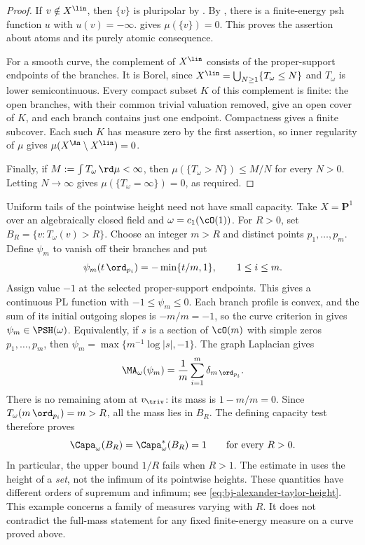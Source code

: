 \begin{proof}
If $v\notin X^{\lin}$, then $\{v\}$ is pluripolar by
.  By \cite[Corollary~7.48]{BJ22}, there
is a finite-energy psh function $u$ with $u(v)=-\infty$.
 gives $\mu(\{v\})=0$.
This proves the assertion about atoms and its purely atomic consequence.

For a smooth curve, the complement of $X^{\lin}$ consists of the
proper-support endpoints of the branches.
It is Borel, since
$X^{\lin}=\bigcup_{N\geq1}\{T_\omega\leq N\}$ and $T_\omega$ is lower
semicontinuous.  Every compact subset $K$ of this complement is finite:
the open branches, with their common trivial valuation removed, give
an open cover of $K$, and each branch contains just one endpoint.
Compactness gives a finite subcover.  Each such $K$ has measure zero by
the first assertion, so inner regularity of $\mu$ gives
$\mu(X^{\An}\setminus X^{\lin})=0$.

Finally, if $M:=\int T_\omega\,\rd\mu<\infty$, then
$\mu(\{T_\omega>N\})\leq M/N$ for every $N>0$.
Letting $N\to\infty$ gives $\mu(\{T_\omega=\infty\})=0$, as required.
\end{proof}

\begin{example}
\label{ex:ch49-uniform-tail-capacity}
Uniform tails of the pointwise height need not have small capacity.
Take $X=\mathbf P^1$ over an algebraically closed field and
$\omega=c_1(\cO(1))$.  For $R>0$, set
$B_R=\{v:T_\omega(v)>R\}$.
Choose an integer $m>R$ and distinct points $p_1,\dots,p_m$.
Define $\psi_m$ to vanish off their branches and put
\[
 \psi_m(t\,\ord_{p_i})=-\min\{t/m,1\},\qquad 1\leq i\leq m.
\]
Assign value $-1$ at the selected proper-support endpoints.
This gives a continuous PL function with $-1\leq\psi_m\leq0$.
Each branch profile is convex, and the sum of its initial outgoing
slopes is $-m/m=-1$, so the curve criterion in
 gives $\psi_m\in\PSH(\omega)$.
Equivalently, if $s$ is a section of $\cO(m)$ with simple zeros
$p_1,\dots,p_m$, then
$\psi_m=\max\{m^{-1}\log|s|,-1\}$.
The graph Laplacian gives
\[
 \MA_\omega(\psi_m)
   =\frac1m\sum_{i=1}^m\delta_{m\,\ord_{p_i}}.
\]
There is no remaining atom at $v_{\triv}$: its mass is
$1-m/m=0$.  Since $T_\omega(m\,\ord_{p_i})=m>R$, all the mass lies in
$B_R$.  The defining capacity test therefore proves
\[
 \Capa_\omega(B_R)=\Capa_\omega^*(B_R)=1
 \qquad\text{for every }R>0.
\]
In particular, the upper bound $1/R$ fails when $R>1$.
The estimate in  uses the height of a
\emph{set}, not the infimum of its pointwise heights.  These quantities
have different orders of supremum and infimum; see
\eqref{eq:bj-alexander-taylor-height}.
This example concerns a family of measures varying with $R$.  It does
not contradict the full-mass statement for any fixed finite-energy
measure on a curve proved above.
\end{example}

